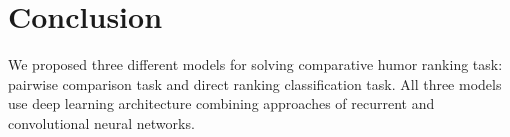 \documentclass[10pt, a4paper]{article}
\begin{document}









\section{Conclusion}

We proposed three different models for solving comparative humor ranking task: pairwise comparison task and direct ranking classification task. All three models use deep learning architecture combining approaches of recurrent and convolutional neural networks.
\end{document}
